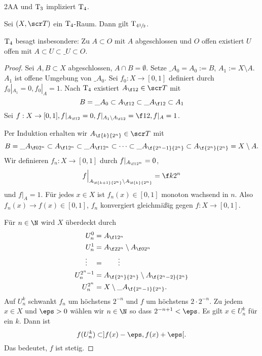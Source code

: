 \begin{lem}[Tychonoff]
	2AA und $\mathrm{T_{3}}$ impliziert $\mathrm{T_{4}}$.
\end{lem}

\begin{st}[Urysohn]
	Sei $(X, \scr T)$ ein $\mathrm{T_{4}}$-Raum.
	Dann gilt $\mathrm{T_{4\sfrac 12}}$.
	\begin{note}
		$\mathrm{T_{4}}$ besagt insbesondere:
		Zu $A \subset O$ mit $A$ abgeschlossen und $O$ offen existiert $U$ offen mit $A \subset U \subset  \_{U} \subset O$.
	\end{note}
	\begin{proof}
		Sei $A, B \subset X$ abgeschlossen, $A \cap B = \emptyset$.
		Setze $\_{A_0} = A_0 := B$, $A_1 := X \setminus A$.
		$A_1$ ist offene Umgebung von $\_{A_0}$.
		Sei $f_0: X \to [0,1]$ definiert durch $f_0|_{A_1} = 0, f_0|_{A} = 1$.
		Nach $\mathrm{T_{4}}$ existiert $A_{\f 12} \in \scr T$ mit
		\[
			B = \_{A_0} \subset A_{\f 12} \subset \_{A_{\f 12}} \subset A_1
		\]
		Sei $f: X \to [0,1], f|_{A_{\f 12}} = 0, f|_{A_1 \setminus A_{\f 12}} = \f 12, f|_A = 1$.

		Per Induktion erhalten wir $A_{\f {k}{2^n}} \in \scr T$ mit
		\[
			B = \_{A_{\f 0{2^n}}} \subset A_{\f 1{2^n}} \subset \_{A_{\f 1{2^n}}}
			\subset \dotsb \subset
			\_{A_{\f{2^n - 1}{2^n}}}
			\subset A_{\f {2^n}{2^n}}
			= X \setminus A.
		\]
		Wir definieren $f_n : X \to [0,1]$ durch $f|_{A_{\f 1{2^n}}} = 0$,
		\[
			f\Big|_{A_{\f {k+1}{2^n}} \setminus A_{\f {k}{2^n}}}
			= \f k{2^n}
		\]
		und $f|_A = 1$.
		Für jedes $x \in X$ ist $f_n(x) \in [0,1]$ monoton wachsend in $n$.
		Also $f_n(x) \to f(x) \in [0,1]$, $f_n$ konvergiert gleichmäßig gegen $f: X \to [0,1]$.

		Für $n \in \N$ wird $X$ überdeckt durch
		\begin{align*}
			U_n^0 &= A_{\f 1{2^n}} \\
			U_n^1 &= A_{\f 2{2^n}} \setminus A_{\f 0{2^n}} \\
			\vdots \quad &= \qquad \vdots \\
			U_n^{2^n-1} &= A_{\f {2^n}{2^n}} \setminus A_{\f {2^n-2}{2^n}} \\
			U_n^{2^n} &= X \setminus \_{A_{\f {2^n-1}{2^n}}}.
		\end{align*}
		Auf $U_n^k$ schwankt $f_n$ um höchstens $2^{-n}$ und $f$ um höchstens $2\cdot 2^{-n}$.
		Zu jedem $x \in X$ und $\eps > 0$ wählen wir $n \in \N$ so dass $2^{-n+1} < \eps$.
		Es gilt $x \in U_n^k$ für ein $k$.
		Dann ist
		\[
			f(U_n^k) \subset ]f(x) - \eps, f(x) + \eps[.
		\]
		Das bedeutet, $f$ ist stetig.
	\end{proof}
\end{st}


